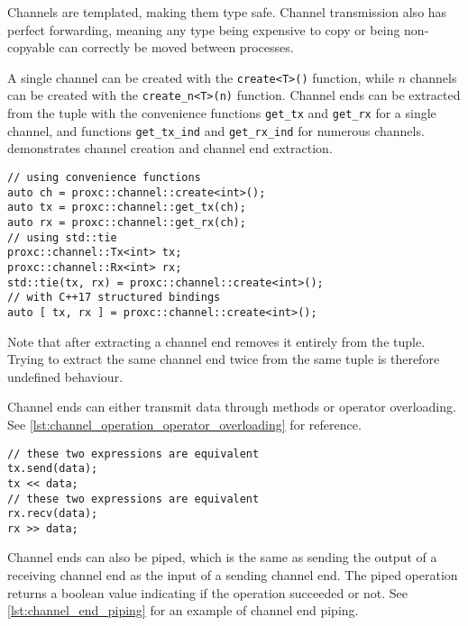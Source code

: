 Channels are templated, making them type safe. Channel transmission also has perfect forwarding, meaning any type being expensive to copy or being non\hyp{}copyable can correctly be moved between processes.

A single channel can be created with the \lstinline[style={CustomC++}]|create<T>()| function, while $n$ channels can be created with the \lstinline[style={CustomC++}]|create_n<T>(n)| function. Channel ends can be extracted from the tuple with the convenience functions \lstinline[style={CustomC++}]|get_tx| and \lstinline[style={CustomC++}]|get_rx| for a single channel, and functions \lstinline[style={CustomC++}]|get_tx_ind| and \lstinline[style={CustomC++}]|get_rx_ind| for numerous channels.  demonstrates channel creation and channel end extraction.

\begin{lstfloat}
\begin{lstlisting}[caption={Channel creation and channel end extraction.}, label={lst:channel_creation}, style={CustomC++}]
// using convenience functions
auto ch = proxc::channel::create<int>();
auto tx = proxc::channel::get_tx(ch);
auto rx = proxc::channel::get_rx(ch);
// using std::tie
proxc::channel::Tx<int> tx;
proxc::channel::Rx<int> rx;
std::tie(tx, rx) = proxc::channel::create<int>();
// with C++17 structured bindings
auto [ tx, rx ] = proxc::channel::create<int>();
\end{lstlisting}
\end{lstfloat}

Note that after extracting a channel end removes it entirely from the tuple. Trying to extract the same channel end twice from the same tuple is therefore undefined behaviour. 

Channel ends can either transmit data through methods or operator overloading. See \cref{lst:channel_operation_operator_overloading} for reference.

\begin{lstfloat}
\begin{lstlisting}[caption={Channel operation and operator overloading.}, label={lst:channel_operation_operator_overloading}, style={CustomC++}]
// these two expressions are equivalent
tx.send(data);
tx << data;
// these two expressions are equivalent
rx.recv(data);
rx >> data;
\end{lstlisting}
\end{lstfloat}

Channel ends can also be piped, which is the same as sending the output of a receiving channel end as the input of a sending channel end. The piped operation returns a boolean value indicating if the operation succeeded or not. See \cref{lst:channel_end_piping} for an example of channel end piping.

